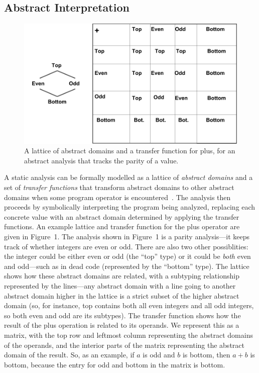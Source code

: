 \documentclass[10pt,conference]{IEEEtran}
\begin{document}
\subsection{Abstract Interpretation}

\begin{figure}
 \includegraphics[width=\linewidth]{parity.png}
 \caption{A lattice of abstract domains and a transfer function
   for plus, for an abstract analysis that tracks the parity of
 a value.}
\label{fig-parity}
\end{figure} 

A static analysis can be formally modelled
as a lattice of \textit{abstract domains} and a set of \textit{transfer functions}
that transform abstract domains to other abstract domains when some
program operator is encountered~\cite{cousot77}. The analysis then proceeds by symbolically
interpreting the program being analyzed, replacing each concrete value with
an abstract domain determined by applying the transfer functions. An example
lattice and transfer function for the plus operator are given in Figure~1.
The analysis shown in Figure~1 is a parity analysis---it keeps track of
whether integers are even or odd. There are also two other possiblities:
the integer could be either even or odd (the ``top'' type) or it could
be \textit{both} even and odd---such as in dead code (represented by the
``bottom'' type). The lattice shows how these abstract domains are related,
with a subtyping relationship represented by the lines---any abstract domain
with a line going to another abstract domain higher in the lattice is a strict
subset of the higher abstract domain (so, for instance, top contains both
all even integers and all odd integers, so both even and odd are its subtypes).
The transfer function shows how the result of the plus operation is related
to its operands. We represent this as a matrix, with the top row and leftmost
column representing the abstract domains of the operands, and the interior
parts of the matrix representing the abstract domain of the result. So,
as an example, if $a$ is odd and $b$ is bottom, then $a + b$ is bottom,
because the entry for odd and bottom in the matrix is bottom.
\end{document}
